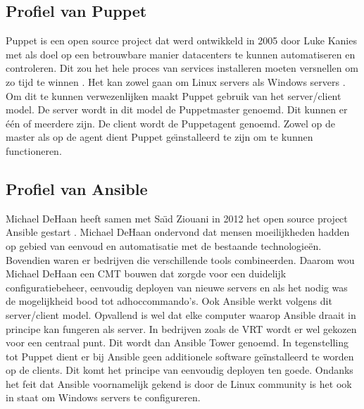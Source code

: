 \subsection{Profiel van Puppet}
Puppet is een open source project dat werd ontwikkeld in 2005 door Luke Kanies \autocite{PuppetLeaders} met als doel op een betrouwbare manier datacenters te kunnen automatiseren en controleren. Dit zou het hele proces van services installeren moeten versnellen om zo tijd te winnen \autocite{how-puppet-works}. Het kan zowel gaan om Linux servers als Windows servers \autocite{PuppetForWindows}. Om dit te kunnen verwezenlijken maakt Puppet gebruik van het server/client model. De server wordt in dit model de Puppetmaster genoemd. Dit kunnen er \'e\'en of meerdere zijn.  De client wordt de Puppetagent genoemd. Zowel op de master als op de agent dient Puppet ge{\"\i}nstalleerd te zijn om te kunnen functioneren. \autocite{puppetdoc} \autocite{puppetfaq}


\subsection{Profiel van Ansible}
Michael DeHaan heeft samen met Sa{\"\i}d Ziouani in 2012 het open source project Ansible gestart \autocite{ansiblefordevops}.  Michael DeHaan ondervond dat mensen moeilijkheden hadden op gebied van eenvoud en automatisatie met de bestaande technologie\"en. Bovendien waren er bedrijven die verschillende tools combineerden. Daarom wou Michael DeHaan een \gls{CMT} bouwen dat zorgde voor een duidelijk configuratiebeheer, eenvoudig deployen van nieuwe servers en als het nodig was de mogelijkheid bood tot \gls{adhoccommando}'s.  Ook Ansible werkt volgens dit server/client model. Opvallend is wel dat elke computer waarop Ansible draait in principe kan fungeren als server. In bedrijven zoals de VRT wordt er wel gekozen voor een centraal punt. Dit wordt dan Ansible Tower genoemd. In tegenstelling tot Puppet dient er bij Ansible geen additionele software ge\"installeerd te worden op de clients. Dit komt het principe van eenvoudig deployen ten goede. Ondanks het feit dat Ansible voornamelijk gekend is door de Linux community is het ook in staat om Windows servers te configureren. \autocite{ansibleforwindows}









